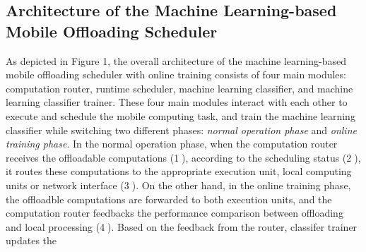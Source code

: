 \documentclass[10pt, conference, compsocconf]{IEEEtran}
\begin{document}
\subsection{Architecture of the Machine Learning-based Mobile Offloading
Scheduler}
%
As depicted in Figure 1, the overall architecture of the machine
learning-based mobile offloading scheduler with online training consists
of four main modules: computation router, runtime scheduler, machine
learning classifier, and machine learning classifier trainer.
%
These four main modules interact with each other to execute and
schedule the mobile computing task, and train the machine learning
classifier while switching two different phases: \textit{normal
operation phase} and \textit{online training phase}.
%
In the normal operation phase, when the computation router receives the
offloadable computations (\textcircled{1}), according to the scheduling
status (\textcircled{2}), it routes these computations to the
appropriate execution unit, local computing units or network interface
(\textcircled{3}). 
%
On the other hand, in the online training phase, the offloadble
computations are forwarded to both execution units, and the computation
router feedbacks the performance comparison between offloading and local
processing (\textcircled{4}).
%
Based on the feedback from the router, classifer trainer updates the
\end{document}
